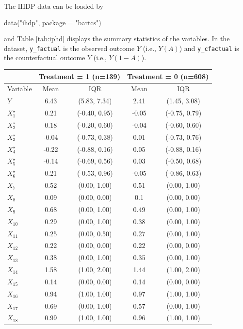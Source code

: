 The IHDP data can be loaded by
\begin{example}
data("ihdp", package = "bartcs")
\end{example}
and Table \ref{tab:iphd} displays the summary statistics of the variables. In the dataset, \verb|y_factual| is the observed outcome $Y$ (i.e., $Y(A)$) and \verb|y_cfactual| is the counterfactual outcome $Y$ (i.e., $Y(1-A)$). 
\begin{table}[ht]
\centering
\begin{tabular}{l|cc|cc}
   & \multicolumn{2}{c|}{Treatment = 1 (n=139)}& \multicolumn{2}{c}{Treatment = 0 (n=608)} \\ \hline
Variable & Mean & IQR & Mean & IQR \\ 
   \hline
$Y$ & 6.43 & (5.83, 7.34) & 2.41 & (1.45, 3.08) \\ 
  $X^{\star}_{1}$ & 0.21 & (-0.40, 0.95) & -0.05 & (-0.75, 0.79) \\ 
  $X^{\star}_{2}$ & 0.18 & (-0.20, 0.60) & -0.04 & (-0.60, 0.60) \\ 
  $X^{\star}_{3}$ & -0.04 & (-0.73, 0.38) & 0.01 & (-0.73, 0.76) \\ 
  $X^{\star}_{4}$ & -0.22 & (-0.88, 0.16) & 0.05 & (-0.88, 0.16) \\ 
  $X^{\star}_{5}$ & -0.14 & (-0.69, 0.56) & 0.03 & (-0.50, 0.68) \\ 
  $X^{\star}_{6}$ & 0.21 & (-0.53, 0.96) & -0.05 & (-0.86, 0.63) \\ 
  $X_{7}$ & 0.52 & (0.00, 1.00) & 0.51 & (0.00, 1.00) \\ 
  $X_{8}$ & 0.09 & (0.00, 0.00) & 0.1 & (0.00, 0.00) \\ 
  $X_{9}$ & 0.68 & (0.00, 1.00) & 0.49 & (0.00, 1.00) \\ 
  $X_{10}$ & 0.29 & (0.00, 1.00) & 0.38 & (0.00, 1.00) \\ 
  $X_{11}$ & 0.25 & (0.00, 0.50) & 0.27 & (0.00, 1.00) \\ 
  $X_{12}$ & 0.22 & (0.00, 0.00) & 0.22 & (0.00, 0.00) \\ 
  $X_{13}$ & 0.38 & (0.00, 1.00) & 0.35 & (0.00, 1.00) \\ 
  $X_{14}$ & 1.58 & (1.00, 2.00) & 1.44 & (1.00, 2.00) \\ 
  $X_{15}$ & 0.14 & (0.00, 0.00) & 0.14 & (0.00, 0.00) \\ 
  $X_{16}$ & 0.94 & (1.00, 1.00) & 0.97 & (1.00, 1.00) \\ 
  $X_{17}$ & 0.69 & (0.00, 1.00) & 0.57 & (0.00, 1.00) \\ 
  $X_{18}$ & 0.99 & (1.00, 1.00) & 0.96 & (1.00, 1.00) \\ 

\end{tabular}
\end{table}
